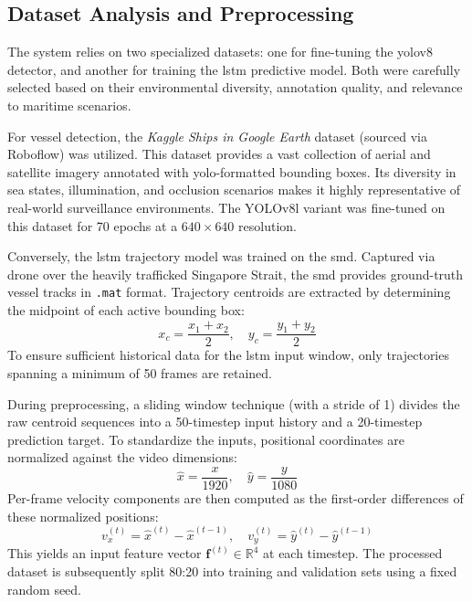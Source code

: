 \subsection{Dataset Analysis and Preprocessing}
The system relies on two specialized datasets: one for fine-tuning the \gls{yolov8} detector, and another for training the \gls{lstm} predictive model. Both were carefully selected based on their environmental diversity, annotation quality, and relevance to maritime scenarios.

For vessel detection, the \textit{Kaggle Ships in Google Earth} dataset (sourced via Roboflow) was utilized. This dataset provides a vast collection of aerial and satellite imagery annotated with \gls{yolo}-formatted bounding boxes. Its diversity in sea states, illumination, and occlusion scenarios makes it highly representative of real-world surveillance environments. The YOLOv8l variant was fine-tuned on this dataset for 70 epochs at a $640 \times 640$ resolution.

Conversely, the \gls{lstm} trajectory model was trained on the \gls{smd}. Captured via drone over the heavily trafficked Singapore Strait, the \gls{smd} provides ground-truth vessel tracks in \texttt{.mat} format. Trajectory centroids are extracted by determining the midpoint of each active bounding box:
\begin{equation}
    x_c = \frac{x_1 + x_2}{2}, \quad y_c = \frac{y_1 + y_2}{2}
    \label{eq:gps_conversion}
\end{equation}
To ensure sufficient historical data for the \gls{lstm} input window, only trajectories spanning a minimum of 50 frames are retained. 

During preprocessing, a sliding window technique (with a stride of 1) divides the raw centroid sequences into a 50-timestep input history and a 20-timestep prediction target. To standardize the inputs, positional coordinates are normalized against the video dimensions:
\begin{equation}
    \hat{x} = \frac{x}{1920}, \quad \hat{y} = \frac{y}{1080}
    \label{eq:lat_offset}
\end{equation}
Per-frame velocity components are then computed as the first-order differences of these normalized positions:
\begin{equation}
    v_x^{(t)} = \hat{x}^{(t)} - \hat{x}^{(t-1)}, \quad 
    v_y^{(t)} = \hat{y}^{(t)} - \hat{y}^{(t-1)}
    \label{eq:haversine}
\end{equation}
This yields an input feature vector $\mathbf{f}^{(t)} \in \mathbb{R}^4$ at each timestep. The processed dataset is subsequently split 80:20 into training and validation sets using a fixed random seed.

